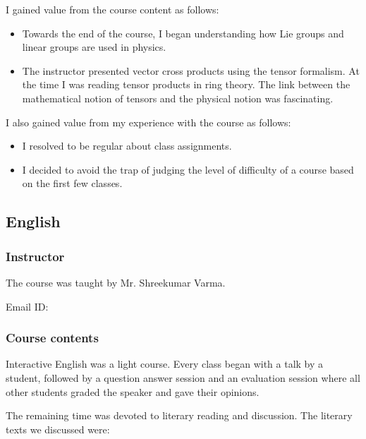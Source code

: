 \documentclass[a4paper]{amsart}
\begin{document}
I gained value from the course content as follows:

\begin{itemize}

\item Towards the end of the course, I began understanding how  Lie groups and 
  linear groups are used in physics.

\item The instructor presented vector cross 
  products using the tensor formalism. At the time I was reading tensor
  products in ring theory. The link between the mathematical notion
  of tensors and the physical notion was fascinating.

\end{itemize}

I also gained value from my experience with the course as follows:

\begin{itemize}

\item I resolved to be regular about class assignments. 

\item I decided to avoid the trap of judging the level of difficulty of a course based on the first few classes.

\end{itemize}

\subsection{English}\label{english}

\subsubsection{Instructor}

The course was taught by Mr. Shreekumar Varma. 

Email ID: 

\subsubsection{Course contents}

Interactive English was a light course. Every class began with a talk by a student, followed by a question answer
session and an evaluation session where all other students graded the speaker and gave their  opinions.

The remaining time was devoted to literary reading and discussion. The literary texts we discussed were:
\end{document}
